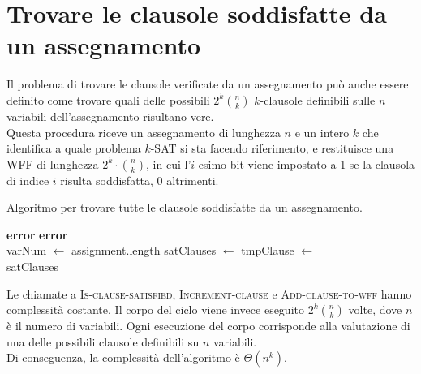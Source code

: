 \section{Trovare le clausole soddisfatte da un assegnamento}
Il problema di trovare le clausole verificate da un assegnamento può anche essere definito
come trovare quali delle possibili $2^k \binom{n}{k}$ $k$-clausole definibili sulle $n$
variabili dell'assegnamento risultano vere.\\
Questa procedura riceve un assegnamento di lunghezza $n$ 
e un intero $k$ che identifica a quale problema $k$-SAT si
sta facendo riferimento, e restituisce una WFF di lunghezza $2^k \cdot \binom{n}{k}$,
in cui l'$i$-esimo bit viene impostato a 1 se la clausola di indice
$i$ risulta soddisfatta, 0 altrimenti.
\begin{algorithm}[H]
    \caption{Algoritmo per trovare tutte le clausole soddisfatte da un assegnamento.}
    \label{alg:find_sat_clauses}
    \begin{algorithmic}[1]
                \State \textbf{error}
            \EndIf
                \State \textbf{error}
            \EndIf\\

            \State varNum $\gets$ assignment.length
            \State satClauses $\gets$ 
            \State tmpClause $\gets$ \\

                    \State {}
                \EndIf
                \State {}
            \EndFor
            \State \Return satClauses
        \EndProcedure
    \end{algorithmic}
\end{algorithm}
Le chiamate a \textsc{Is-clause-satisfied}, \textsc{Increment-clause} e \textsc{Add-clause-to-wff} hanno complessità costante.
Il corpo del ciclo viene invece eseguito $2^k \binom{n}{k}$ volte, 
dove $n$ è il numero di variabili. Ogni esecuzione del corpo
corrisponde alla valutazione di una delle possibili clausole definibili
su $n$ variabili.\\
Di conseguenza, la complessità dell'algoritmo è $\Theta (n^k)$.


